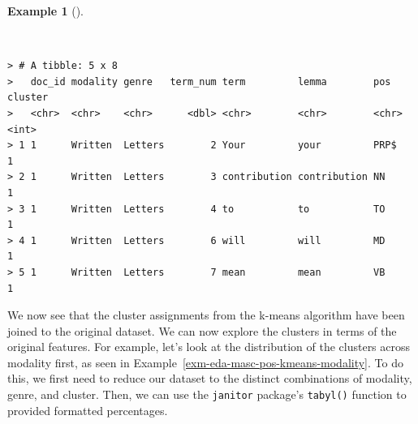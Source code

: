 \documentclass[
  letterpaper,
  DIV=11,
  numbers=noendperiod]{scrreprt}
\newenvironment{Shaded}{\begin{snugshade}}{\end{snugshade}}
\newcommand{\AttributeTok}[1]{\textcolor[rgb]{0.00,0.00,0.00}{#1}}
\newcommand{\CommentTok}[1]{\textcolor[rgb]{0.00,0.00,0.00}{\textit{#1}}}
\newcommand{\DecValTok}[1]{\textcolor[rgb]{0.00,0.00,0.00}{#1}}
\newcommand{\FunctionTok}[1]{\textcolor[rgb]{0.00,0.00,0.00}{#1}}
\newcommand{\NormalTok}[1]{\textcolor[rgb]{0.00,0.00,0.00}{#1}}
\newcommand{\OtherTok}[1]{\textcolor[rgb]{0.00,0.00,0.00}{#1}}
\newcommand{\SpecialCharTok}[1]{\textcolor[rgb]{0.00,0.00,0.00}{#1}}
\newcommand{\StringTok}[1]{\textcolor[rgb]{0.00,0.00,0.00}{#1}}
\theoremstyle{definition}
\newtheorem{example}{Example}[chapter]
\theoremstyle{remark}
\begin{document}
\begin{example}[]\protect\hypertarget{exm-eda-masc-pos-kmeans-join}{}\label{exm-eda-masc-pos-kmeans-join}

~

\begin{Shaded}
\end{Shaded}

\begin{verbatim}
> # A tibble: 5 x 8
>   doc_id modality genre   term_num term         lemma        pos   cluster
>   <chr>  <chr>    <chr>      <dbl> <chr>        <chr>        <chr>   <int>
> 1 1      Written  Letters        2 Your         your         PRP$        1
> 2 1      Written  Letters        3 contribution contribution NN          1
> 3 1      Written  Letters        4 to           to           TO          1
> 4 1      Written  Letters        6 will         will         MD          1
> 5 1      Written  Letters        7 mean         mean         VB          1
\end{verbatim}

\end{example}

We now see that the cluster assignments from the k-means algorithm have
been joined to the original dataset. We can now explore the clusters in
terms of the original features. For example, let's look at the
distribution of the clusters across modality first, as seen in
Example~\ref{exm-eda-masc-pos-kmeans-modality}. To do this, we first
need to reduce our dataset to the distinct combinations of modality,
genre, and cluster. Then, we can use the \texttt{janitor} package's
\texttt{tabyl()} function to provided formatted percentages.
\end{document}
